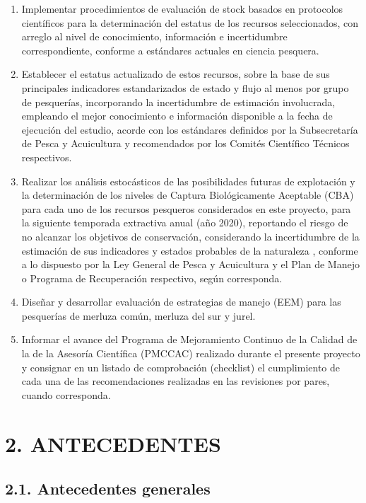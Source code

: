 \documentclass[
  spanish,
]{article}
\begin{document}
\begin{enumerate}
\def\labelenumi{\arabic{enumi}.}
\item
  Implementar procedimientos de evaluación de stock basados en
  protocolos científicos para la determinación del estatus de los
  recursos seleccionados, con arreglo al nivel de conocimiento,
  información e incertidumbre correspondiente, conforme a estándares
  actuales en ciencia pesquera.
\item
  Establecer el estatus actualizado de estos recursos, sobre la base de
  sus principales indicadores estandarizados de estado y flujo al menos
  por grupo de pesquerías, incorporando la incertidumbre de estimación
  involucrada, empleando el mejor conocimiento e información disponible
  a la fecha de ejecución del estudio, acorde con los estándares
  definidos por la Subsecretaría de Pesca y Acuicultura y recomendados
  por los Comités Científico Técnicos respectivos.
\item
  Realizar los análisis estocásticos de las posibilidades futuras de
  explotación y la determinación de los niveles de Captura
  Biológicamente Aceptable (CBA) para cada uno de los recursos pesqueros
  considerados en este proyecto, para la siguiente temporada extractiva
  anual (año 2020), reportando el riesgo de no alcanzar los objetivos de
  conservación, considerando la incertidumbre de la estimación de sus
  indicadores y estados probables de la naturaleza , conforme a lo
  dispuesto por la Ley General de Pesca y Acuicultura y el Plan de
  Manejo o Programa de Recuperación respectivo, según corresponda.
\item
  Diseñar y desarrollar evaluación de estrategias de manejo (EEM) para
  las pesquerías de merluza común, merluza del sur y jurel.
\item
  Informar el avance del Programa de Mejoramiento Continuo de la Calidad
  de la de la Asesoría Científica (PMCCAC) realizado durante el presente
  proyecto y consignar en un listado de comprobación (checklist) el
  cumplimiento de cada una de las recomendaciones realizadas en las
  revisiones por pares, cuando corresponda.
\end{enumerate}

\pagebreak

\hypertarget{antecedentes}{%
\section{2. ANTECEDENTES}\label{antecedentes}}

\hypertarget{antecedentes-generales}{%
\subsection{2.1. Antecedentes generales}\label{antecedentes-generales}}
\end{document}
